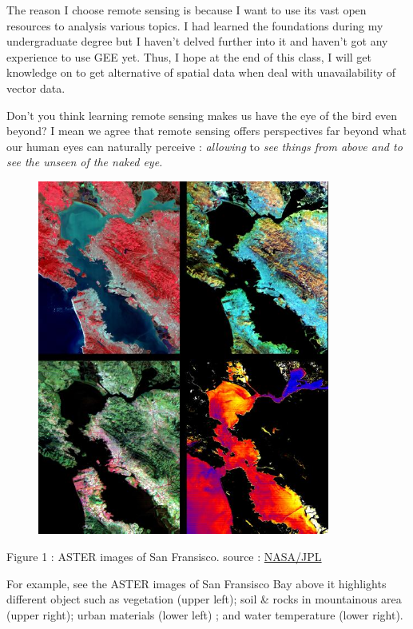 \documentclass[
  letterpaper,
  DIV=11,
  numbers=noendperiod]{scrreprt}
\begin{document}
The reason I choose remote sensing is because I want to use its vast
open resources to analysis various topics. I had learned the foundations
during my undergraduate degree but I haven't delved further into it and
haven't got any experience to use GEE yet. Thus, I hope at the end of
this class, I will get knowledge on to get alternative of spatial data
when deal with unavailability of vector data.

Don't you think learning remote sensing makes us have the eye of the
bird even beyond? I mean we agree that remote sensing offers
perspectives far beyond what our human eyes can naturally perceive :
\emph{allowing} to \emph{see things from above and to see the unseen of
the naked eye.}

\begin{figure}

\href{https://photojournal.jpl.nasa.gov/jpegMod/PIA02605_modest.jpg}{\includegraphics[width=3.78125in,height=\textheight]{images/PIA02605_modest.jpg}}

\end{figure}

Figure 1 : ASTER images of San Fransisco. source :
\href{https://photojournal.jpl.nasa.gov/catalog/PIA02605}{NASA/JPL}

For example, see the ASTER images of San Fransisco Bay above it
highlights different object such as vegetation (upper left); soil \&
rocks in mountainous area (upper right); urban materials (lower left) ;
and water temperature (lower right).
\end{document}
